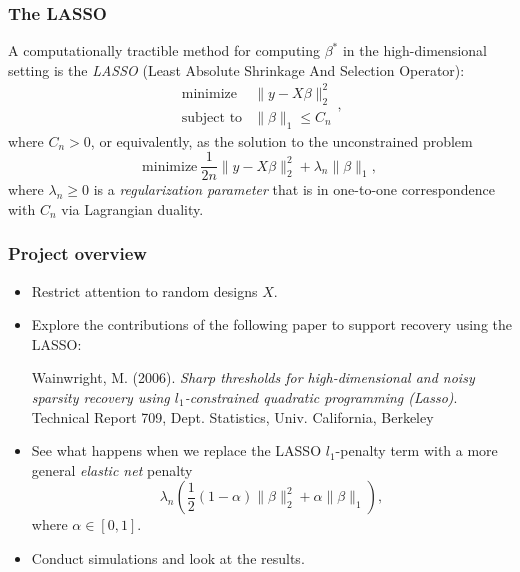 \documentclass{beamer}
\newcommand{\norm}[1]{\lVert#1\rVert}
\begin{document}
\begin{frame}
\frametitle{The LASSO}

A computationally tractible method for computing $\beta^\ast$ in the
high-dimensional setting is the \textit{LASSO} (Least Absolute
Shrinkage And Selection Operator):
\begin{equation*}
  \begin{array}{ll}
    \text{minimize} & \norm{y - X\beta}_2^2 \\
    \text{subject to}
      & \norm{\beta}_1 \leq C_n
  \end{array},
\end{equation*}
where $C_n > 0$, or equivalently, as the solution to the unconstrained
problem
\begin{equation*}
  \text{minimize} \
    \frac{1}{2n} \norm{y - X\beta}_2^2 + \lambda_n \norm{\beta}_1,
\end{equation*}
where $\lambda_n \geq 0$ is a \textit{regularization parameter} that
is in one-to-one correspondence with $C_n$ via Lagrangian duality.

\end{frame}

\begin{frame}
\frametitle{Project overview}

\begin{itemize}
\item Restrict attention to random designs $X$.
\item Explore the contributions of the following paper to support
  recovery using the LASSO:
  \begin{flushleft}
    Wainwright, M. (2006).
    \textit{Sharp thresholds for high-dimensional and noisy sparsity
      recovery using $l_1$-constrained quadratic programming (Lasso)}.
    Technical Report 709, Dept. Statistics, Univ. California, Berkeley
  \end{flushleft}
\item See what happens when we replace the LASSO $l_1$-penalty term
  with a more general \textit{elastic net} penalty
  \begin{equation*}
    \lambda_n \left( \frac{1}{2} (1 - \alpha) \norm{\beta}_2^2
      + \alpha \norm{\beta}_1 \right ),
  \end{equation*}
  where $\alpha \in [0, 1]$.
\item Conduct simulations and look at the results.
\end{itemize}

\end{frame}
\end{document}
